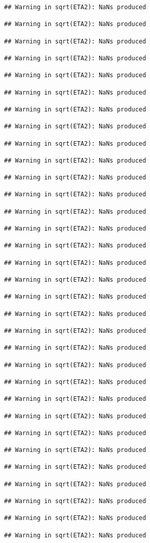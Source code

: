 \documentclass[
]{article}
\begin{document}
\begin{verbatim}
## Warning in sqrt(ETA2): NaNs produced

## Warning in sqrt(ETA2): NaNs produced

## Warning in sqrt(ETA2): NaNs produced

## Warning in sqrt(ETA2): NaNs produced

## Warning in sqrt(ETA2): NaNs produced

## Warning in sqrt(ETA2): NaNs produced

## Warning in sqrt(ETA2): NaNs produced

## Warning in sqrt(ETA2): NaNs produced

## Warning in sqrt(ETA2): NaNs produced

## Warning in sqrt(ETA2): NaNs produced

## Warning in sqrt(ETA2): NaNs produced

## Warning in sqrt(ETA2): NaNs produced

## Warning in sqrt(ETA2): NaNs produced

## Warning in sqrt(ETA2): NaNs produced

## Warning in sqrt(ETA2): NaNs produced

## Warning in sqrt(ETA2): NaNs produced

## Warning in sqrt(ETA2): NaNs produced

## Warning in sqrt(ETA2): NaNs produced

## Warning in sqrt(ETA2): NaNs produced

## Warning in sqrt(ETA2): NaNs produced

## Warning in sqrt(ETA2): NaNs produced

## Warning in sqrt(ETA2): NaNs produced

## Warning in sqrt(ETA2): NaNs produced

## Warning in sqrt(ETA2): NaNs produced

## Warning in sqrt(ETA2): NaNs produced

## Warning in sqrt(ETA2): NaNs produced

## Warning in sqrt(ETA2): NaNs produced

## Warning in sqrt(ETA2): NaNs produced

## Warning in sqrt(ETA2): NaNs produced

## Warning in sqrt(ETA2): NaNs produced

## Warning in sqrt(ETA2): NaNs produced

## Warning in sqrt(ETA2): NaNs produced


\end{verbatim}
\end{document}
